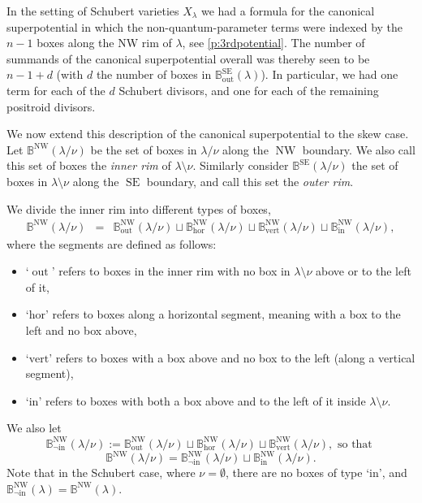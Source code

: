\documentclass{amsart}
\theoremstyle{definition}
\numberwithin{equation}{section}
\def\NW{\operatorname{NW}}
\def\SE{\operatorname{SE}}
\def\out{\operatorname{out}}
\newcommand{\BB}{{\mathbb B}}
\begin{document}
In the setting of Schubert varieties $X_\lambda$  we had a formula for the canonical superpotential in which the non-quantum-parameter terms were indexed by the $n-1$ boxes along the NW rim of $\lambda$, see \cref{p:3rdpotential}. The number of summands of the canonical superpotential overall was thereby seen to be $n-1+d$ (with $d$ the number of boxes in $\BB^{\SE}_{\out}(\lambda)$). In particular, we had one term for each of the $d$ Schubert divisors, and one for each of the remaining positroid divisors.

We  now extend this description of the canonical superpotential  to 
the skew case.  Let $\BB^{\NW}(\lambda/\nu)$ be the set of boxes in $\lambda/\nu$ along the $\NW$ boundary. We also call this set of boxes the \textit{inner rim} of $\lambda\setminus \nu$. Similarly consider $\BB^{\SE}(\lambda/\nu)$ the set of boxes in $\lambda\setminus\nu$ along the $\SE$ boundary, and call this set the \textit{outer rim}. 

We divide the inner rim into different types of boxes, 
\begin{equation*}
\begin{array}{ccc}
\BB^{\NW}(\lambda/\nu)&=&\BB^{\NW}_{\out}(\lambda/\nu)\sqcup \BB^{\NW}_{\mathrm{hor}}(\lambda/\nu)\sqcup \BB^{\NW}_{\mathrm{vert}}(\lambda/\nu)\sqcup\BB^{\NW}_{\mathrm{in}}(\lambda/\nu),
\end{array}
\end{equation*}
where the segments are defined as follows: 
\begin{itemize}
\item `$\out$' refers to boxes in the inner rim   with no box in $\lambda\setminus\nu$ above or to the left of it, 
\item `$\mathrm{hor}$' refers to boxes along a horizontal segment, meaning with a box to the left and no box above,
\item  `$\mathrm{vert}$' refers to boxes with a box above and no box to the left (along a vertical segment),
\item `$\mathrm{in}$' refers to boxes with both a box above and to the left of it inside $\lambda\setminus\nu$.
\end{itemize}
We also let 
\[\BB^{\NW}_{\neg \mathrm{in}}(\lambda/\nu):=\BB^{\NW}_{\out}(\lambda/\nu)\sqcup \BB^{\NW}_{\mathrm{hor}}(\lambda/\nu)\sqcup \BB^{\NW}_{\mathrm{vert}}(\lambda/\nu),
\text{ so that }
\]
\[
\BB^{\NW}(\lambda/\nu)=\BB^{\NW}_{\neg \mathrm{in}}(\lambda/\nu)\sqcup\BB^{\NW}_{\mathrm{in}}(\lambda/\nu).
\]
Note that in the Schubert case, where $\nu=\emptyset$, there are no boxes of type `$\mathrm{in}$', and $\BB^{\NW}_{\neg\mathrm{in}}(\lambda)=\BB^{\NW}(\lambda)$. 
\end{document}
